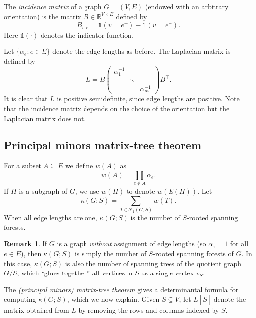 \documentclass[12pt]{amsart}
\theoremstyle{definition}
\newtheorem{rmk}[thm]{Remark}
\newcommand{\RR}{\mathbb{R}}
\newcommand{\one}{\mathds{1}}
\newcommand{\La}{L}
\newcommand{\tr}{\intercal}
\newcommand{\trees}{\mathcal{F}_1}
\begin{document}
The {\em incidence matrix} of a graph $G = (V,E)$ (endowed with an arbitrary orientation) is the matrix $B \in \RR^{V \times E}$ defined by
\[
	B_{v, e} = \one(v = e^+) - \one(v = e^-).
\]
Here $\one(\cdot)$ denotes the indicator function.

Let $\{ \alpha_e \colon e \in E\}$ denote the edge lengths as before. 
The Laplacian matrix is defined by
\begin{equation}\label{eq:weighted-laplacian}
	\La = B \begin{pmatrix}
	\alpha_1^{-1} & & \\
	& \ddots & \\
	& & \alpha_m^{-1}
	\end{pmatrix} B^\tr .
\end{equation}
It is clear that $\La$ is positive semidefinite, since edge lengths are positive. 
Note that the incidence matrix depends on the choice of the orientation but the Laplacian matrix does not.


\subsection{Principal minors matrix-tree theorem}

For a subset $A \subseteq E$ we define $w(A)$ as
\[
	w(A) = \prod_{e \not\in A} \alpha_e .
\]
If $H$ is a subgraph of $G$, we use $w(H)$ to denote $w(E(H))$. 
Let 
\[
	\kappa(G;S) = \sum_{T \in \trees(G; S)} w(T) .
\]
When all edge lengths are one, $\kappa(G; S)$ is the number of $S$-rooted spanning forests.

\begin{rmk}
If $G$ is a graph {\em without} assignment of edge lengths (so $\alpha_e=1$ for all $e \in E$), then $\kappa(G;S)$ is simply the number of $S$-rooted spanning forests of $G$.
In this case, $\kappa(G;S)$ is also the number of spanning trees of the quotient graph $G / S$, which ``glues together'' all vertices in $S$ as a single vertex $v_S$.
\end{rmk}


The {\em (principal minors) matrix-tree theorem} gives a determinantal formula for computing $\kappa(G;S)$, which we now explain. 
Given $S \subseteq V$, let $L[\overline S]$ denote the matrix obtained from $L$ by removing the rows and columns indexed by $S$.
\end{document}
